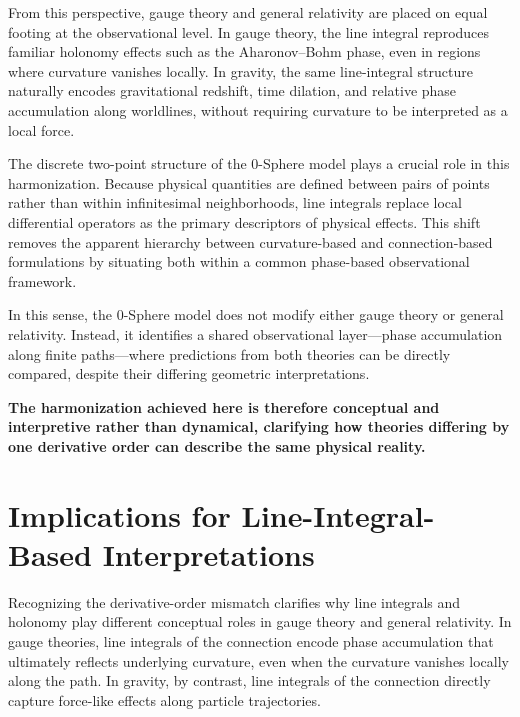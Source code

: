 \documentclass[12pt,letterpaper]{article}
\begin{document}
From this perspective, gauge theory and general relativity are placed on equal footing at the observational level. In gauge theory, the line integral reproduces familiar holonomy effects such as the Aharonov--Bohm phase, even in regions where curvature vanishes locally. In gravity, the same line-integral structure naturally encodes gravitational redshift, time dilation, and relative phase accumulation along worldlines, without requiring curvature to be interpreted as a local force.

The discrete two-point structure of the 0-Sphere model plays a crucial role in this harmonization. Because physical quantities are defined between pairs of points rather than within infinitesimal neighborhoods, line integrals replace local differential operators as the primary descriptors of physical effects. This shift removes the apparent hierarchy between curvature-based and connection-based formulations by situating both within a common phase-based observational framework.

In this sense, the 0-Sphere model does not modify either gauge theory or general relativity. Instead, it identifies a shared observational layer—phase accumulation along finite paths—where predictions from both theories can be directly compared, despite their differing geometric interpretations.

\textbf{The harmonization achieved here is therefore conceptual and interpretive rather than dynamical, clarifying how theories differing by one derivative order can describe the same physical reality.}



\section{Implications for Line-Integral-Based Interpretations}

\justifying
Recognizing the derivative-order mismatch clarifies why line integrals and holonomy play different conceptual roles in gauge theory and general relativity. In gauge theories, line integrals of the connection encode phase accumulation that ultimately reflects underlying curvature, even when the curvature vanishes locally along the path. In gravity, by contrast, line integrals of the connection directly capture force-like effects along particle trajectories.
\end{document}
